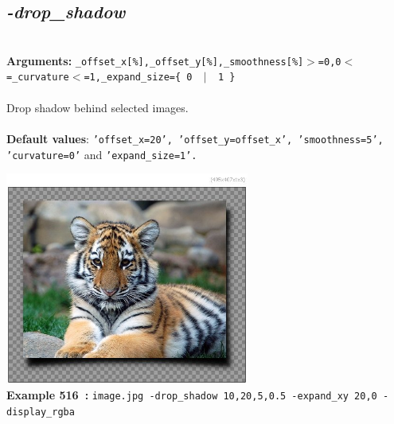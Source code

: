 \documentclass[a4paper,11pt,twoside]{book}
\begin{document}
\subsection{\emph{-drop\_shadow} }\vspace*{-0.5em}
~\\\textbf{Arguments: } 
{\small \texttt{\_offset\_x[\%],\_offset\_y[\%],\_smoothness[\%]$>$=0,0$<$=\_curvature$<$=1,\_expand\_size=\{ 0 ~$|$~ 1 \}}}\\~\\
Drop shadow behind selected images.
~\\~\\\textbf{Default values}: {\small \texttt{'offset\_x=20', 'offset\_y=offset\_x', 'smoothness=5', 'curvature=0'} and \texttt{'expand\_size=1'.}}
\begin{center}\includegraphics[keepaspectratio=true,height=7cm,width=\textwidth]{img/gmic_def516.jpg}\\
{\footnotesize \textbf{Example 516~:} \texttt{image.jpg -drop\_shadow 10,20,5,0.5 -expand\_xy 20,0 -display\_rgba}}
\end{center}
\end{document}
